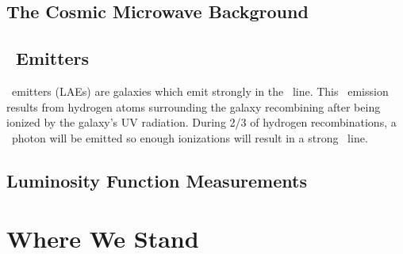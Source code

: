 \subsection{The Cosmic Microwave Background}\label{sec:CMB}
\subsection{\lya\ Emitters}

\lya\ emitters (LAEs) are galaxies which emit strongly in the \lya\ line. This \lya\ emission results from hydrogen atoms surrounding the galaxy recombining after being ionized by the galaxy's UV radiation. During 2/3 of hydrogen recombinations, a \lya\ photon will be emitted so enough ionizations will result in a strong \lya\ line. 

\subsection{Luminosity Function Measurements}

\section{Where We Stand}




